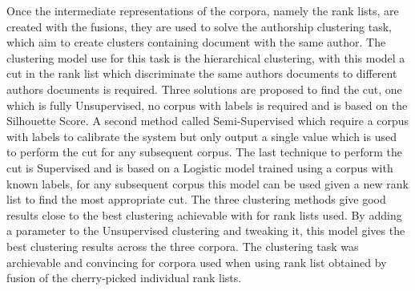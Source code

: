 Once the intermediate representations of the corpora, namely the rank lists, are created with the fusions, they are used to solve the authorship clustering task, which aim to create clusters containing document with the same author.
The clustering model use for this task is the hierarchical clustering, with this model a cut in the rank list which discriminate the same authors documents to different authors documents is required.
Three solutions are proposed to find the cut, one which is fully Unsupervised, no corpus with labels is required and is based on the Silhouette Score.
A second method called Semi-Supervised which require a corpus with labels to calibrate the system but only output a single value which is used to perform the cut for any subsequent corpus.
The last technique to perform the cut is Supervised and is based on a Logistic model trained using a corpus with known labels, for any subsequent corpus this model can be used given a new rank list to find the most appropriate cut.
The three clustering methods give good results close to the best clustering achievable with for rank lists used.
By adding a parameter to the Unsupervised clustering and tweaking it, this model gives the best clustering results across the three corpora.
The clustering task was archievable and convincing for corpora used when using rank list obtained by fusion of the cherry-picked individual rank lists.
